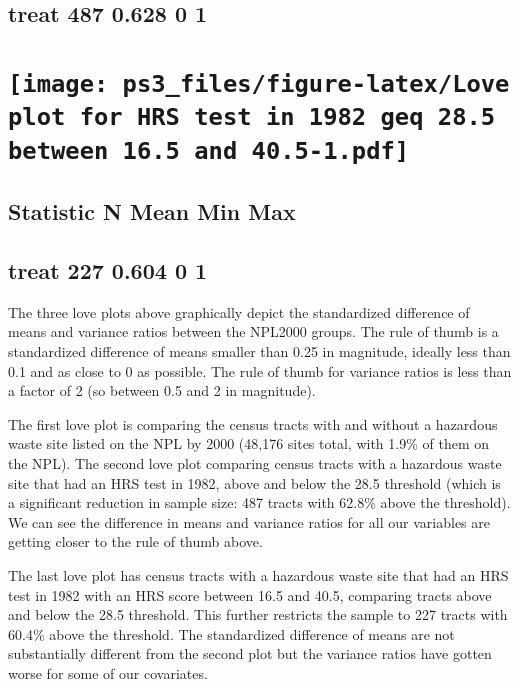 \documentclass[
]{article}
\begin{document}
\hypertarget{treat-487-0.628-0-1}{%
\subsection{treat 487 0.628 0 1}\label{treat-487-0.628-0-1}}

\hypertarget{section-1}{%
\section[]{\texorpdfstring{\protect\texttt{[image: ps3\_files/figure-latex/Love plot for HRS test in 1982 geq 28.5 between 16.5 and 40.5-1.pdf]}}{}}\label{section-1}}

\hypertarget{statistic-n-mean-min-max-1}{%
\subsection{Statistic N Mean Min Max}\label{statistic-n-mean-min-max-1}}

\hypertarget{treat-227-0.604-0-1}{%
\subsection{treat 227 0.604 0 1}\label{treat-227-0.604-0-1}}

The three love plots above graphically depict the standardized
difference of means and variance ratios between the NPL2000 groups. The
rule of thumb is a standardized difference of means smaller than 0.25 in
magnitude, ideally less than 0.1 and as close to 0 as possible. The rule
of thumb for variance ratios is less than a factor of 2 (so between 0.5
and 2 in magnitude).

The first love plot is comparing the census tracts with and without a
hazardous waste site listed on the NPL by 2000 (48,176 sites total, with
1.9\% of them on the NPL). The second love plot comparing census tracts
with a hazardous waste site that had an HRS test in 1982, above and
below the 28.5 threshold (which is a significant reduction in sample
size: 487 tracts with 62.8\% above the threshold). We can see the
difference in means and variance ratios for all our variables are
getting closer to the rule of thumb above.

The last love plot has census tracts with a hazardous waste site that
had an HRS test in 1982 with an HRS score between 16.5 and 40.5,
comparing tracts above and below the 28.5 threshold. This further
restricts the sample to 227 tracts with 60.4\% above the threshold. The
standardized difference of means are not substantially different from
the second plot but the variance ratios have gotten worse for some of
our covariates.
\end{document}
